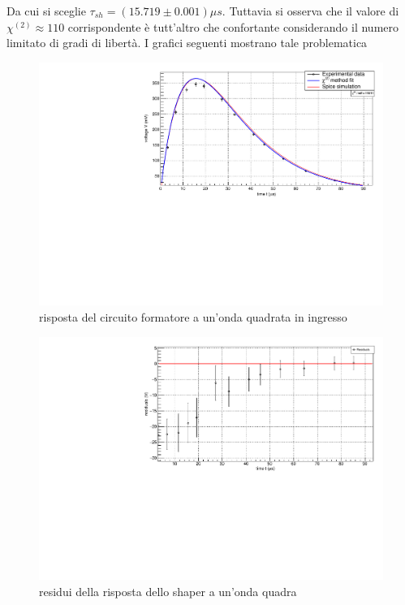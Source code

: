 \documentclass{article}
\begin{document}
Da cui si sceglie $\tau_{sh} = (15.719\pm 0.001) \mu s$.  Tuttavia si osserva che
il valore di $\chi^{(2)} \approx 110 $ corrispondente è tutt'altro che confortante 
considerando il numero limitato di gradi di libertà. I grafici seguenti
mostrano tale problematica


\begin{center}
    \begin{figure}[H]
    \centering
    \includegraphics[scale=0.375, angle=0]{forma_no_pz.pdf}
    \caption{risposta del circuito formatore a un'onda quadrata in ingresso}
    \label{fig:forma_no_pz}
    \end{figure}
\end{center}

\begin{center}
    \begin{figure}[H]
    \centering
    \includegraphics[scale=0.375, angle=0]{residui_forma_onda_no_pz.pdf}
    \caption{residui della risposta dello shaper a un'onda quadra}
    \label{fig:forma_no_pz}
    \end{figure}
\end{center}
\end{document}
